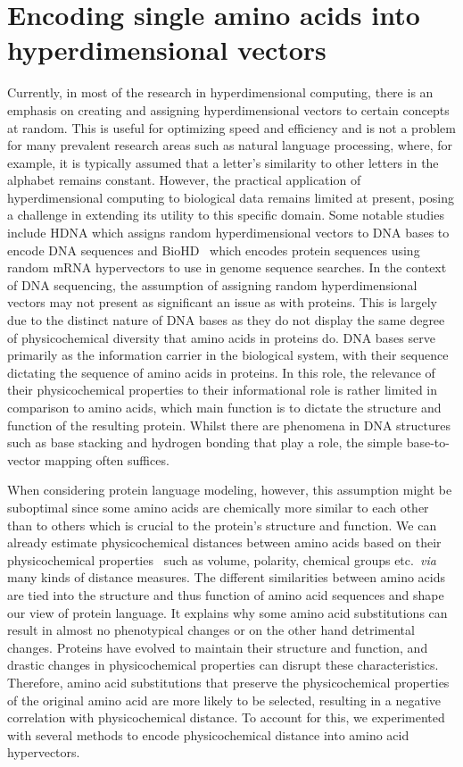 \section{Encoding single amino acids into hyperdimensional vectors}
Currently, in most of the research in hyperdimensional computing, there is an emphasis on creating and assigning hyperdimensional vectors to certain concepts at random. This is useful for optimizing speed and efficiency and is not a problem for many prevalent research areas such as natural language processing, where, for example, it is typically assumed that a letter's similarity to other letters in the alphabet remains constant. However, the practical application of hyperdimensional computing to biological data remains limited at present, posing a challenge in extending its utility to this specific domain. Some notable studies include HDNA which assigns random hyperdimensional vectors to DNA bases to encode DNA sequences and BioHD~\cite{biohd} which encodes protein sequences using random mRNA hypervectors to use in genome sequence searches. In the context of DNA sequencing, the assumption of assigning random hyperdimensional vectors may not present as significant an issue as with proteins. This is largely due to the distinct nature of DNA bases as they do not display the same degree of physicochemical diversity that amino acids in proteins do. DNA bases serve primarily as the information carrier in the biological system, with their sequence dictating the sequence of amino acids in proteins. In this role, the relevance of their physicochemical properties to their informational role is rather limited in comparison to amino acids, which main function is to dictate the structure and function of the resulting protein. Whilst there are phenomena in DNA structures such as base stacking and hydrogen bonding that play a role, the simple base-to-vector mapping often suffices.

When considering protein language modeling, however, this assumption might be suboptimal since some amino acids are chemically more similar to each other than to others which is crucial to the protein's structure and function. We can already estimate physicochemical distances between amino acids based on their physicochemical properties~\cite{physicochem} such as volume, polarity, chemical groups etc.\ \textit{via} many kinds of distance measures. The different similarities between amino acids are tied into the structure and thus function of amino acid sequences and shape our view of protein language. It explains why some amino acid substitutions can result in almost no phenotypical changes or on the other hand detrimental changes. Proteins have evolved to maintain their structure and function, and drastic changes in physicochemical properties can disrupt these characteristics. Therefore, amino acid substitutions that preserve the physicochemical properties of the original amino acid are more likely to be selected, resulting in a negative correlation with physicochemical distance. To account for this, we experimented with several methods to encode physicochemical distance into amino acid hypervectors.

